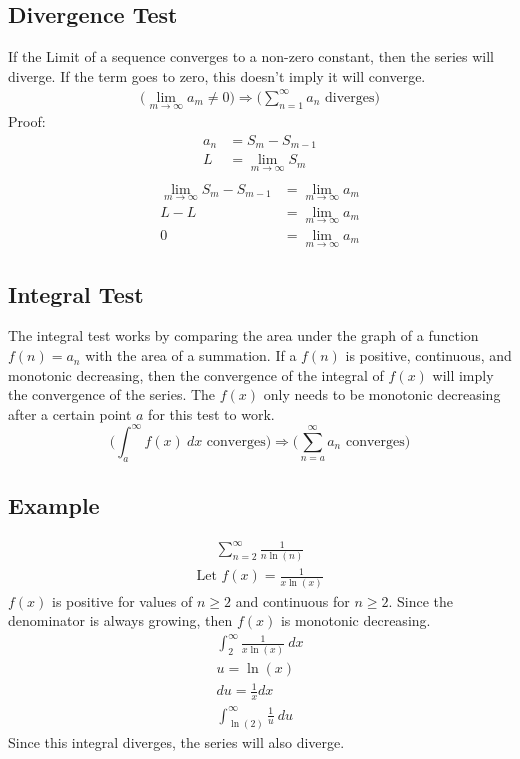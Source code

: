 \documentclass{article}
\theoremstyle{mytheoremstyle}
\theoremstyle{mytheoremstyle}
\theoremstyle{myproblemstyle}
\begin{document}
    \subsection*{Divergence Test}
    If the Limit of a sequence converges to a non-zero constant, then the series
    will diverge.
    If the term goes to zero, this doesn't imply it will converge.
    \begin{align*}
        \Big(\lim_{m\to \infty} a_m \ne 0\Big)
        \Rightarrow \Big(\sum_{n=1}^{\infty} a_n \text{ diverges}\Big)
    \end{align*}
    Proof:
    \begin{align*}
        a_n &= S_m - S_{m-1} \\
        L &= \lim_{m\to \infty} S_m \\
    \end{align*}
    \begin{align*}
        \lim_{m\to \infty} S_m - S_{m-1} &= \lim_{m\to \infty} a_m \\
        L-L &= \lim_{m\to \infty} a_m \\
        0 &= \lim_{m\to \infty} a_m
    \end{align*}

    \subsection*{Integral Test}
    The integral test works by comparing the area under the graph of a function
    $f(n)=a_n$ with the area of a summation. If a $f(n)$ is positive,
    continuous, and monotonic decreasing, then the convergence of the integral
    of $f(x)$ will imply the convergence of the series. The $f(x)$ only needs to
    be monotonic decreasing after a certain point $a$ for this test to work.
    \[
        \Big(\int_{a}^{\infty} f(x) \ dx \text{ converges}\Big)
        \Rightarrow \Big(\sum_{n=a}^{\infty} a_n \text{ converges}\Big)
    \]

    \subsection*{Example}
    \begin{align*}
        \sum_{n=2}^{\infty} \frac{1}{n\ln(n)}
    \end{align*}
    \begin{align*}
        \text{Let } f(x) = \frac{1}{x\ln(x)}
    \end{align*}
    $f(x)$ is positive for values of $n\ge 2$ and continuous for $n\ge 2$. Since
    the denominator is always growing, then $f(x)$ is monotonic decreasing.
    \begin{align*}
        \int_{2}^{\infty} \frac{1}{x\ln(x)} \ dx \\
        u = \ln(x) \\
        du = \frac{1}{x} dx \\
        \int_{\ln(2)}^{\infty} \frac{1}{u} \ du
    \end{align*}
    Since this integral diverges, the series will also diverge.
\end{document}

